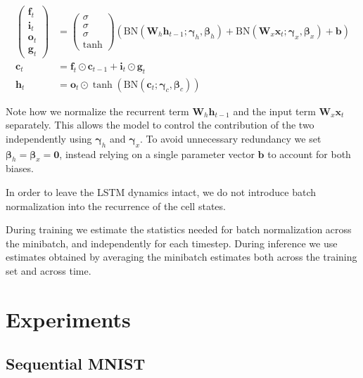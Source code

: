 \documentclass{article} %
\newcommand{\vect}[1]{\mathbf{#1}}
\newcommand{\mat}[1]{\mathbf{#1}}
\newcommand{\ewprod}{\odot}
\begin{document}
\begin{align}
\left(\begin{array}{ccc}
\vect{f}_t \\
\vect{i}_t \\
\vect{o}_t \\
\vect{g}_t
\end{array}\right)
 &=
\left(\begin{array}{ccc}
\sigma \\
\sigma \\
\sigma \\
\tanh
\end{array}\right)
\left(
 \mathrm{BN} (\mat{W}_h \vect{h}_{t-1}; \vect{\gamma}_h, \vect{\beta}_h) +
 \mathrm{BN} (\mat{W}_x \vect{x}_t    ; \vect{\gamma}_x, \vect{\beta}_x) +
 \vect{b}
\right) \\
\vect{c}_t &= \vect{f}_t \ewprod \vect{c}_{t-1} +
              \vect{i}_t \ewprod \vect{g}_t \\
\vect{h}_t &= \vect{o}_t \ewprod \tanh(
 \mathrm{BN} (\vect{c}_t; \vect{\gamma}_c, \vect{\beta}_c)
)
\end{align}

Note how we normalize the recurrent term $\mat{W}_h \vect{h}_{t-1}$ and the input term $\mat{W}_x \vect{x}_t$ separately.
This allows the model to control the contribution of the two independently using $\vect{\gamma}_h$ and $\vect{\gamma}_x$.
To avoid unnecessary redundancy we set $\vect{\beta}_h = \vect{\beta}_x = \vect{0}$, instead relying on a single parameter vector $\vect{b}$ to account for both biases.

In order to leave the LSTM dynamics intact, we do not introduce batch normalization into the recurrence of the cell states.

During training we estimate the statistics needed for batch normalization across the minibatch, and independently for each timestep.
During inference we use estimates obtained by averaging the minibatch estimates both across the training set and across time.

\section{Experiments}

\subsection{Sequential MNIST}
\end{document}
